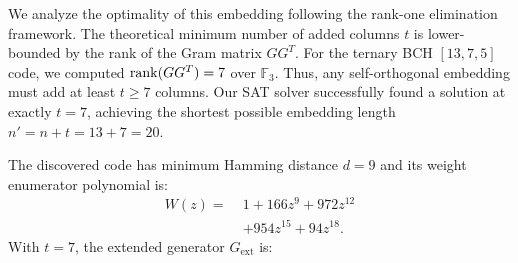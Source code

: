 \begin{proposition}
We analyze the optimality of this embedding following the rank-one elimination framework. The theoretical minimum number of added columns $t$ is lower-bounded by the rank of the Gram matrix $GG^T$. For the ternary BCH $[13,7,5]$ code, we computed $\mathrm{rank}(GG^T) = 7$ over $\mathbb{F}_3$. Thus, any self-orthogonal embedding must add at least $t \ge 7$ columns. Our SAT solver successfully found a solution at exactly $t=7$, achieving the shortest possible embedding length $n' = n + t = 13 + 7 = 20$.

The discovered code has minimum Hamming distance $d=9$ and its weight enumerator polynomial is:
\begin{align*}
W(z) =\; & 1 + 166z^9 + 972z^{12} \\
&+ 954z^{15} + 94z^{18}.
\end{align*}
With $t=7$, the extended generator $G_{\text{ext}}$ is:
\begin{center}
\end{center}
\end{proposition}

